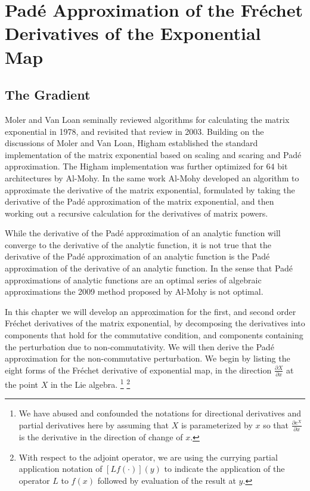 \chapter{Pad\'{e} Approximation of the Fr\'{e}chet Derivatives of the Exponential Map}
\section{The Gradient}
Moler and Van Loan seminally reviewed algorithms for calculating the matrix 
exponential in 1978, and revisited that review in 2003\cite{moler_nineteen_1978,moler_nineteen_2003}. 
Building on the discussions of Moler and Van Loan, Higham established the 
standard implementation of the matrix exponential based on scaling and scaring 
and Pad\'{e} approximation\cite{higham_scaling_2005,higham_functions_2008}.
The Higham implementation was further optimized for $64$ bit architectures by 
Al-Mohy\cite{al-mohy_new_2009}. In the same work Al-Mohy developed an algorithm 
to approximate the derivative of the matrix exponential, formulated by taking 
the derivative of the Pad\'{e} approximation of the matrix exponential, and then 
working out a recursive calculation for the derivatives of matrix powers\cite{al-mohy_computing_2009}.

While the derivative of the Pad\'{e} approximation of an analytic function will 
converge to the derivative of the analytic function, it is not true that the
derivative of the Pad\'{e} approximation of an analytic function is the Pad\'{e} 
approximation of the derivative of an analytic function. In the sense that 
Pad\'{e} approximations of analytic functions are an optimal series of algebraic 
approximations the 2009 method proposed by Al-Mohy is not optimal.

In this chapter we will develop an approximation for the first, and second order
Fr\'{e}chet derivatives of the matrix exponential, by decomposing the 
derivatives into components that hold for the commutative condition, and 
components containing the perturbation due to non-commutativity. We will then 
derive the Pad\'{e} approximation for the non-commutative perturbation. We begin 
by listing the eight forms of the Fr\'{e}chet derivative of exponential map, in 
the direction $\frac{\partial X}{\partial x}$ at the point $X$ in the Lie 
algebra.
\footnote{We have abused and confounded the notations for directional 
derivatives and partial derivatives here by assuming that $X$ is parameterized 
by $x$ so that $\frac{\partial e^X}{\partial x}$ is the derivative in the
direction of change of $x$.}
\footnote{With respect to the adjoint operator, we are using the currying 
partial application notation of $\left[L f\left(\cdotp\right)\right]\left(y\right)$
to indicate the application of the operator $L$ to $f\left(x\right)$ followed by
evaluation of the result at $y$.}

